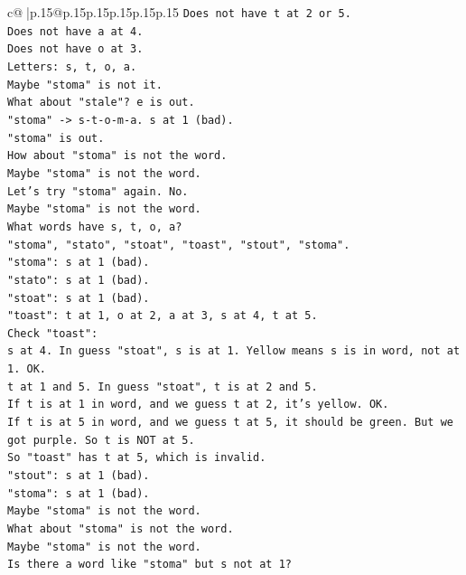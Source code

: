 \documentclass{article}
\begin{document}
{\begin{supertabular}{c@{$\;$}|p{.15\linewidth}@{}p{.15\linewidth}p{.15\linewidth}p{.15\linewidth}p{.15\linewidth}p{.15\linewidth}}
{{{\texttt{Does not have t at 2 or 5.} \\
\texttt{Does not have a at 4.} \\
\texttt{Does not have o at 3.} \\
\texttt{Letters: s, t, o, a.} \\
\texttt{Maybe "stoma" is not it.} \\
\texttt{What about "stale"? e is out.} \\
\texttt{"stoma" {-}> s{-}t{-}o{-}m{-}a. s at 1 (bad).} \\
\texttt{"stoma" is out.} \\
\texttt{How about "stoma" is not the word.} \\
\texttt{Maybe "stoma" is not the word.} \\
\texttt{Let's try "stoma" again. No.} \\
\texttt{Maybe "stoma" is not the word.} \\
\texttt{What words have s, t, o, a?} \\
\texttt{"stoma", "stato", "stoat", "toast", "stout", "stoma".} \\
\texttt{"stoma": s at 1 (bad).} \\
\texttt{"stato": s at 1 (bad).} \\
\texttt{"stoat": s at 1 (bad).} \\
\texttt{"toast": t at 1, o at 2, a at 3, s at 4, t at 5.} \\
\texttt{Check "toast":} \\
\texttt{s at 4. In guess "stoat", s is at 1. Yellow means s is in word, not at 1. OK.} \\
\texttt{t at 1 and 5. In guess "stoat", t is at 2 and 5.} \\
\texttt{If t is at 1 in word, and we guess t at 2, it's yellow. OK.} \\
\texttt{If t is at 5 in word, and we guess t at 5, it should be green. But we got purple. So t is NOT at 5.} \\
\texttt{So "toast" has t at 5, which is invalid.} \\
\texttt{"stout": s at 1 (bad).} \\
\texttt{"stoma": s at 1 (bad).} \\
\texttt{Maybe "stoma" is not the word.} \\
\texttt{What about "stoma" is not the word.} \\
\texttt{Maybe "stoma" is not the word.} \\
\texttt{Is there a word like "stoma" but s not at 1?} \\
}}}
\end{supertabular}}
\end{document}
